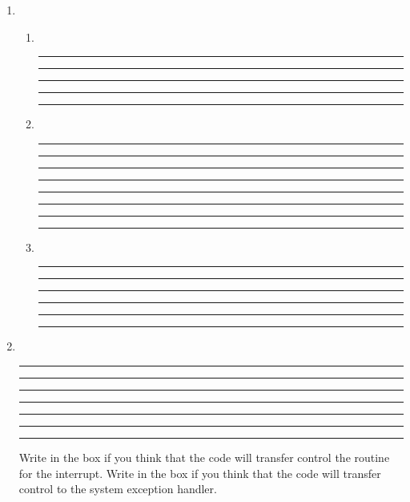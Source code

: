 \documentclass[a4paper,10pt]{article}
\begin{document}
\begin{enumerate}
\item~

\begin{enumerate}

\item~

\vspace{7mm}\hrule\vspace{7mm}\hrule\vspace{7mm}\hrule\vspace{7mm}\hrule
\vspace{7mm}\hrule\vspace{3mm}

\item~

\vspace{7mm}\hrule\vspace{7mm}\hrule\vspace{7mm}\hrule\vspace{7mm}\hrule
\vspace{7mm}\hrule\vspace{7mm}\hrule\vspace{7mm}\hrule\vspace{7mm}\hrule
\vspace{3mm}

\item~

\vspace{7mm}\hrule\vspace{7mm}\hrule\vspace{7mm}\hrule\vspace{7mm}\hrule
\vspace{7mm}\hrule\vspace{7mm}\hrule\vspace{3mm}

\end{enumerate}

\newpage

\item~

\vspace{7mm}\hrule\vspace{7mm}\hrule\vspace{7mm}\hrule\vspace{7mm}\hrule
\vspace{7mm}\hrule\vspace{7mm}\hrule\vspace{7mm}\hrule\vspace{3mm}


Write  in the box if you think that the code
will transfer control the  routine for the
interrupt. Write  in the box if you think that the
code will transfer control to the system exception handler.


\end{enumerate}
\end{document}
